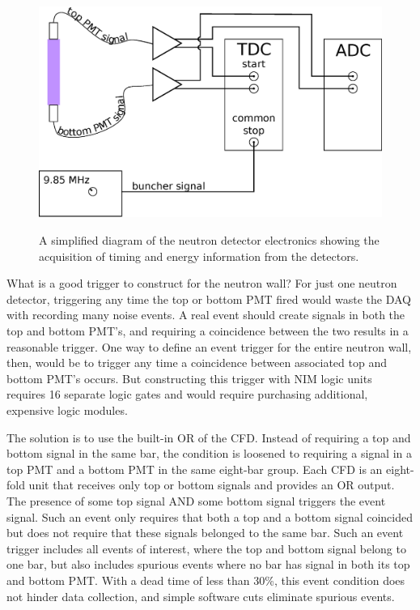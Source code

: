 \begin{figure}[htp]
\centering
\includegraphics[width=1.0\textwidth]{figures/basic_electronics.eps}
\label{fig:simpleElectronics}
\caption{A simplified diagram of the neutron detector electronics showing the acquisition of timing and energy information from the detectors.}
\end{figure}

What is a good trigger to construct for the neutron wall?  For just one neutron detector, triggering any time the top or bottom PMT fired would waste the DAQ with recording many noise events.  A real event should create signals in both the top and bottom PMT's, and requiring a coincidence between the two results in a reasonable trigger.  One way to define an event trigger for the entire neutron wall, then, would be to trigger any time a coincidence between associated top and bottom PMT's occurs.  But constructing this trigger with NIM logic units requires 16 separate logic gates and would require purchasing additional, expensive logic modules.  

The solution is to use the built-in OR of the CFD.  Instead of requiring a top and bottom signal in the same bar, the condition is loosened to requiring a signal in a top PMT and a bottom PMT in the same eight-bar group.  Each CFD is an eight-fold unit that receives only top or bottom signals and provides an OR output.  The presence of some top signal AND some bottom signal triggers the event signal.  Such an event only requires that both a top and a bottom signal coincided but does not require that these signals belonged to the same bar.  Such an event trigger includes all events of interest, where the top and bottom signal belong to one bar, but also includes spurious events where no bar has signal in both its top and bottom PMT.  With a dead time of less than 30\%, this event condition does not hinder data collection, and simple software cuts eliminate spurious events.

